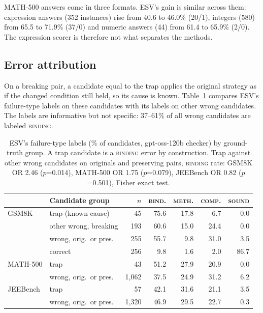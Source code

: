 \documentclass[letterpaper]{article} %
\begin{document}
MATH-500 answers come in three formats. ESV's gain is similar across them: expression answers (352 instances) rise from 40.6 to 46.0\% (20/1), integers (580) from 65.5 to 71.9\% (37/0) and numeric answers (44) from 61.4 to 65.9\% (2/0). The expression scorer is therefore not what separates the methods.

\subsection{Error attribution}
\label{app:attribution}

On a breaking pair, a candidate equal to the trap applies the original strategy as if the changed condition still held, so its cause is known. Table~\ref{tab:attribution} compares ESV's failure-type labels on these candidates with its labels on other wrong candidates. The labels are informative but not specific: 37--61\% of all wrong candidates are labeled \textsc{binding}.

\begin{table}[!ht]
\centering
\small
\setlength{\tabcolsep}{3pt}
\begin{tabular}{llrrrrr}
\toprule
 & Candidate group & $n$ & \textsc{bind.} & \textsc{meth.} & \textsc{comp.} & \textsc{sound} \\
\midrule
GSM8K & trap (known cause) & 45 & 75.6 & 17.8 & 6.7 & 0.0 \\
 & other wrong, breaking & 193 & 60.6 & 15.0 & 24.4 & 0.0 \\
 & wrong, orig.\ or pres. & 255 & 55.7 & 9.8 & 31.0 & 3.5 \\
 & correct & 256 & 9.8 & 1.6 & 2.0 & 86.7 \\
\midrule
MATH-500 & trap & 43 & 51.2 & 27.9 & 20.9 & 0.0 \\
 & wrong, orig.\ or pres. & 1{,}062 & 37.5 & 24.9 & 31.2 & 6.2 \\
\midrule
JEEBench & trap & 57 & 42.1 & 31.6 & 21.1 & 3.5 \\
 & wrong, orig.\ or pres. & 1{,}320 & 46.9 & 29.5 & 22.7 & 0.3 \\
\bottomrule
\end{tabular}
\caption{ESV's failure-type labels (\% of candidates, gpt-oss-120b checker) by ground-truth group. A trap candidate is a \textsc{binding} error by construction. Trap against other wrong candidates on originals and preserving pairs, \textsc{binding} rate: GSM8K OR 2.46 ($p$=0.014), MATH-500 OR 1.75 ($p$=0.079), JEEBench OR 0.82 ($p$=0.501), Fisher exact test.}
\label{tab:attribution}
\end{table}
\end{document}
